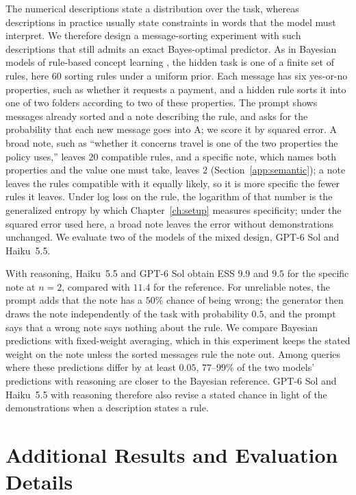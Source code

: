 The numerical descriptions state a distribution over the task, whereas descriptions in practice usually state constraints in words that the model must interpret. We therefore design a message-sorting experiment with such descriptions that still admits an exact Bayes-optimal predictor. As in Bayesian models of rule-based concept learning \citep{goodman2008}, the hidden task is one of a finite set of rules, here $60$ sorting rules under a uniform prior. Each message has six yes-or-no properties, such as whether it requests a payment, and a hidden rule sorts it into one of two folders according to two of these properties. The prompt shows messages already sorted and a note describing the rule, and asks for the probability that each new message goes into A; we score it by squared error. A broad note, such as ``whether it concerns travel is one of the two properties the policy uses,'' leaves $20$ compatible rules, and a specific note, which names both properties and the value one must take, leaves $2$ (Section~\ref{app:semantic}); a note leaves the rules compatible with it equally likely, so it is more specific the fewer rules it leaves. Under log loss on the rule, the logarithm of that number is the generalized entropy by which Chapter~\ref{ch:setup} measures specificity; under the squared error used here, a broad note leaves the error without demonstrations unchanged. We evaluate two of the models of the mixed design, GPT-6 Sol and Haiku~5.5.

With reasoning, Haiku~5.5 and GPT-6 Sol obtain ESS $9.9$ and $9.5$ for the specific note at $n=2$, compared with $11.4$ for the reference. For unreliable notes, the prompt adds that the note has a $50\%$ chance of being wrong; the generator then draws the note independently of the task with probability $0.5$, and the prompt says that a wrong note says nothing about the rule. We compare Bayesian predictions with fixed-weight averaging, which in this experiment keeps the stated weight on the note unless the sorted messages rule the note out. Among queries where these predictions differ by at least $0.05$, $77$--$99\%$ of the two models' predictions with reasoning are closer to the Bayesian reference. GPT-6 Sol and Haiku~5.5 with reasoning therefore also revise a stated chance in light of the demonstrations when a description states a rule.

\section{Additional Results and Evaluation Details}\label{app:llm}

